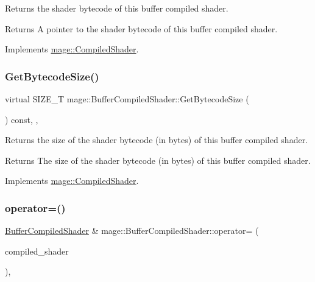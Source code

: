 Returns the shader bytecode of this buffer compiled shader.

\begin{DoxyReturn}{Returns}
A pointer to the shader bytecode of this buffer compiled shader. 
\end{DoxyReturn}


Implements \hyperlink{classmage_1_1_compiled_shader_a3d7a58d568dc30e66ea7488f28911127}{mage\+::\+Compiled\+Shader}.

\hypertarget{classmage_1_1_buffer_compiled_shader_aa9ab3a1df896367280c259734ff29bc0}{}\label{classmage_1_1_buffer_compiled_shader_aa9ab3a1df896367280c259734ff29bc0} 
\subsubsection{\texorpdfstring{Get\+Bytecode\+Size()}{GetBytecodeSize()}}
{\footnotesize\ttfamily virtual S\+I\+Z\+E\+\_\+T mage\+::\+Buffer\+Compiled\+Shader\+::\+Get\+Bytecode\+Size (\begin{DoxyParamCaption}{ }\end{DoxyParamCaption}) const\hspace{0.3cm}{\ttfamily [override]}, {\ttfamily [virtual]}, {\ttfamily [noexcept]}}

Returns the size of the shader bytecode (in bytes) of this buffer compiled shader.

\begin{DoxyReturn}{Returns}
The size of the shader bytecode (in bytes) of this buffer compiled shader. 
\end{DoxyReturn}


Implements \hyperlink{classmage_1_1_compiled_shader_ae9dbc3c205d54cc89b9b0746b76b157b}{mage\+::\+Compiled\+Shader}.

\hypertarget{classmage_1_1_buffer_compiled_shader_ab461431d4a0da425be8e9b2095e4f0b1}{}\label{classmage_1_1_buffer_compiled_shader_ab461431d4a0da425be8e9b2095e4f0b1} 
\subsubsection{\texorpdfstring{operator=()}{operator=()}\hspace{0.1cm}{\footnotesize\ttfamily [1/2]}}
{\footnotesize\ttfamily \hyperlink{classmage_1_1_buffer_compiled_shader}{Buffer\+Compiled\+Shader} \& mage\+::\+Buffer\+Compiled\+Shader\+::operator= (\begin{DoxyParamCaption}\item[{const \hyperlink{classmage_1_1_buffer_compiled_shader}{Buffer\+Compiled\+Shader} \&}]{compiled\+\_\+shader }\end{DoxyParamCaption})\hspace{0.3cm}{\ttfamily [default]}, {\ttfamily [noexcept]}}

